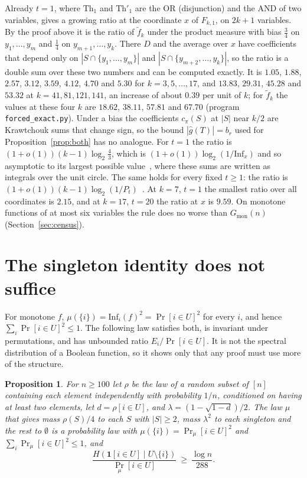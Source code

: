\documentclass[11pt]{amsart}
\newtheorem{proposition}[theorem]{Proposition}
\theoremstyle{remark}
\newcommand{\Inf}{\mathrm{Inf}}
\begin{document}
Already $t=1$, where $\mathrm{Th}_1$ and $\mathrm{Th}'_1$ are the OR (disjunction) and the AND of two variables, gives a growing ratio at the coordinate $x$
of $F_{k,1}$, on $2k+1$ variables. By the proof above it is the ratio of $\tilde f_k$ under the product measure with
bias $\frac34$ on $y_1,\dots,y_m$ and $\frac14$ on $y_{m+1},\dots,y_k$. There $D$ and the average over $x$ have
coefficients that depend only on $|S\cap\{y_1,\dots,y_m\}|$ and $|S\cap\{y_{m+2},\dots,y_k\}|$, so the ratio is a
double sum over these two numbers and can be computed exactly. It is $1.05$, $1.88$, $2.57$, $3.12$, $3.59$, $4.12$,
$4.70$ and $5.30$ for $k=3,5,\dots,17$, and $13.83$, $29.31$, $45.28$ and $53.32$ at $k=41,81,121,141$, an increase
of about $0.39$ per unit of $k$; for $\tilde f_k$ the values at these four $k$ are $18.62$, $38.11$, $57.81$ and
$67.70$ (program \texttt{forced\_exact.py}). Under a bias the coefficients $c_\pi(S)$ at $|S|$ near $k/2$ are
Krawtchouk sums that change sign, so the bound $|\hat g(T)|=b_r$ used for Proposition~\ref{prop:both} has no
analogue. For $t=1$ the ratio is $(1+o(1))(k-1)\log_2\frac43$, which is $(1+o(1))\log_2(1/\Inf_x)$ and so asymptotic
to its largest possible value~\cite{Shm9}, where these sums are written as integrals over the unit circle. The same holds for every fixed $t\ge1$: the ratio is
$(1+o(1))(k-1)\log_2(1/P_t)$~\cite{Shm10}.
At $k=7$, $t=1$ the smallest ratio over all coordinates is $2.15$, and at $k=17$, $t=20$ the ratio at $x$ is
$9.59$. On monotone functions of at most six variables the rule does no worse than $G_{\mathrm{mon}}(n)$
(Section~\ref{sec:census}).

\section{The singleton identity does not suffice}\label{sec:obstruction}

For monotone $f$, $\mu(\{i\})=\Inf_i(f)^2=\Pr[i\in U]^2$ for every $i$, and hence $\sum_i\Pr[i\in U]^2\le1$. The
following law satisfies both, is invariant under permutations, and has unbounded ratio $E_i/\Pr[i\in U]$. It is not
the spectral distribution of a Boolean function, so it shows only that any proof must use more of the structure.

\begin{proposition}\label{prop:law}
For $n\ge100$ let $\rho$ be the law of a random subset of $[n]$ containing each element independently
with probability $1/n$, conditioned on having at least two elements, let $d=\rho[i\in U]$, and $\lambda=(1-\sqrt{1-d})/2$. The law $\mu$ that gives mass $\rho(S)/4$ to each $S$ with $|S|\ge2$, mass $\lambda^2$ to
each singleton and the rest to $\emptyset$ is a probability law with $\mu(\{i\})=\Pr_\mu[i\in U]^2$ and
$\sum_i\Pr_\mu[i\in U]^2\le1$, and
\[
\frac{H(\mathbf 1[i\in U]\mid U\setminus\{i\})}{\Pr_\mu[i\in U]}\ \ge\ \frac{\log n}{288}.
\]
\end{proposition}
\end{document}
